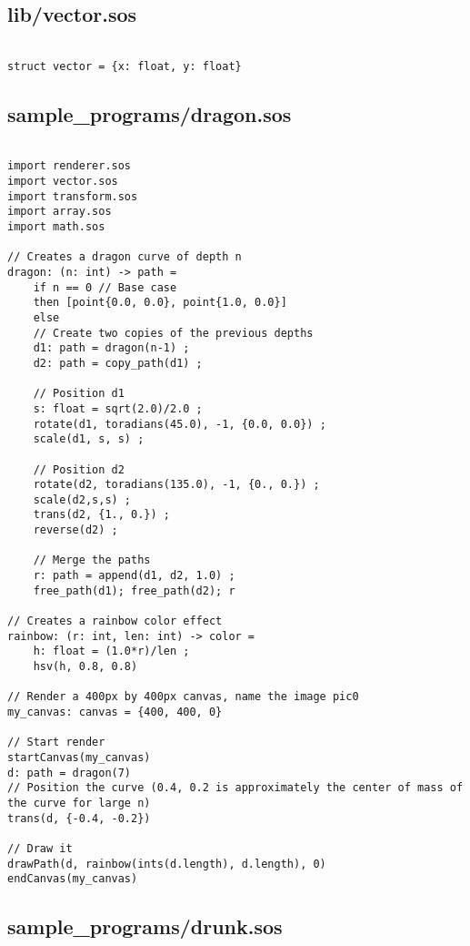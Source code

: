\documentclass[main.tex]{subfiles}
\begin{document}
\subsection{lib/vector.sos}

\begin{lstlisting}

struct vector = {x: float, y: float}

\end{lstlisting}

\subsection{sample\_programs/dragon.sos}

\begin{lstlisting}

import renderer.sos
import vector.sos
import transform.sos
import array.sos
import math.sos

// Creates a dragon curve of depth n
dragon: (n: int) -> path = 
    if n == 0 // Base case
    then [point{0.0, 0.0}, point{1.0, 0.0}]
    else
    // Create two copies of the previous depths
    d1: path = dragon(n-1) ; 
    d2: path = copy_path(d1) ;

    // Position d1
    s: float = sqrt(2.0)/2.0 ;
    rotate(d1, toradians(45.0), -1, {0.0, 0.0}) ; 
    scale(d1, s, s) ; 

    // Position d2
    rotate(d2, toradians(135.0), -1, {0., 0.}) ;
    scale(d2,s,s) ;
    trans(d2, {1., 0.}) ;
    reverse(d2) ;

    // Merge the paths
    r: path = append(d1, d2, 1.0) ;
    free_path(d1); free_path(d2); r

// Creates a rainbow color effect
rainbow: (r: int, len: int) -> color = 
    h: float = (1.0*r)/len ;
    hsv(h, 0.8, 0.8)

// Render a 400px by 400px canvas, name the image pic0
my_canvas: canvas = {400, 400, 0}

// Start render
startCanvas(my_canvas)
d: path = dragon(7)
// Position the curve (0.4, 0.2 is approximately the center of mass of the curve for large n)
trans(d, {-0.4, -0.2})

// Draw it
drawPath(d, rainbow(ints(d.length), d.length), 0)
endCanvas(my_canvas)
\end{lstlisting}

\subsection{sample\_programs/drunk.sos}
\end{document}
